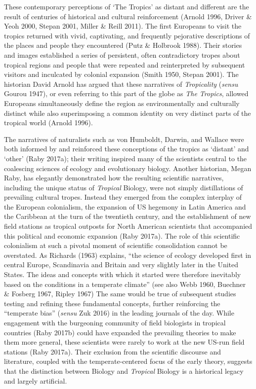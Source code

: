 \documentclass[
  12pt,
  man, donotrepeattitle,floatsintext]{apa6}
\begin{document}
These contemporary perceptions of `The Tropics' as distant and different are the result of centuries of historical and cultural reinforcement (Arnold 1996, Driver \& Yeoh 2000, Stepan 2001, Miller \& Reill 2011). The first Europeans to visit the tropics returned with vivid, captivating, and frequently pejorative descriptions of the places and people they encountered (Putz \& Holbrook 1988). Their stories and images established a series of persistent, often contradictory tropes about tropical regions and people that were repeated and reinterpreted by subsequent visitors and inculcated by colonial expansion (Smith 1950, Stepan 2001). The historian David Arnold has argued that these narratives of \emph{Tropicality} (\emph{sensu} Gourou 1947), or even referring to this part of the globe as \emph{The Tropics}, allowed Europeans simultaneously define the region as environmentally and culturally distinct while also superimposing a common identity on very distinct parts of the tropical world (Arnold 1996).

The narratives of naturalists such as von Humboldt, Darwin, and Wallace were both informed by and reinforced these conceptions of the tropics as `distant' and `other' (Raby 2017a); their writing inspired many of the scientists central to the coalescing sciences of ecology and evolutionary biology. Another historian, Megan Raby, has elegantly demonstrated how the resulting scientific narratives, including the unique status of \emph{Tropical} Biology, were not simply distillations of prevailing cultural tropes. Instead they emerged from the complex interplay of the European colonialism, the expansion of US hegemony in Latin America and the Caribbean at the turn of the twentieth century, and the establishment of new field stations as tropical outposts for North American scientists that accompanied this political and economic expansion (Raby 2017a). The role of this scientific colonialism at such a pivotal moment of scientific consolidation cannot be overstated. As Richards (1963) explains, ``the science of ecology developed first in central Europe, Scandinavia and Britain and very slightly later in the United States. The ideas and concepts with which it started were therefore inevitably based on the conditions in a temperate climate'' (see also Webb 1960, Buechner \& Fosberg 1967, Ripley 1967) The same would be true of subsequent studies testing and refining these fundamental concepts, further reinforcing the ``temperate bias'' (\emph{sensu} Zuk 2016) in the leading journals of the day. While engagement with the burgeoning community of field biologists in tropical countries (Raby 2017b) could have expanded the prevailing theories to make them more general, these scientists were rarely to work at the new US-run field stations (Raby 2017a). Their exclusion from the scientific discourse and literature, coupled with the temperate-centered focus of the early theory, suggests that the distinction between Biology and \emph{Tropical} Biology is a historical legacy and largely artificial.
\end{document}
